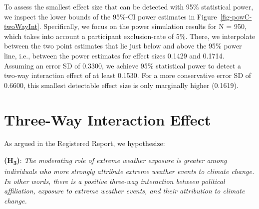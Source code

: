 \documentclass[
  letterpaper,
  DIV=11,
  numbers=noendperiod]{scrartcl}
\begin{document}
To assess the smallest effect size that can be detected with 95\%
statistical power, we inspect the lower bounds of the 95\%-CI power
estimates in Figure~\ref{fig-powC-twoWayInt}. Specifically, we focus on
the power simulation results for N = 950, which takes into account a
participant exclusion-rate of 5\%. There, we interpolate between the two
point estimates that lie just below and above the 95\% power line, i.e.,
between the power estimates for effect sizes 0.1429 and 0.1714. Assuming
an error SD of 0.3300, we achieve 95\% statistical power to detect a
two-way interaction effect of at least 0.1530. For a more conservative
error SD of 0.6600, this smallest detectable effect size is only
marginally higher (0.1619).

\section{Three-Way Interaction
Effect}\label{three-way-interaction-effect}

As argued in the Registered Report, we hypothesize:

\textbf{(H\textsubscript{3})}: \emph{The moderating role of extreme
weather exposure is greater among individuals who more strongly
attribute extreme weather events to climate change. In other words,
there is a positive three-way interaction between political affiliation,
exposure to extreme weather events, and their attribution to climate
change.}
\end{document}
